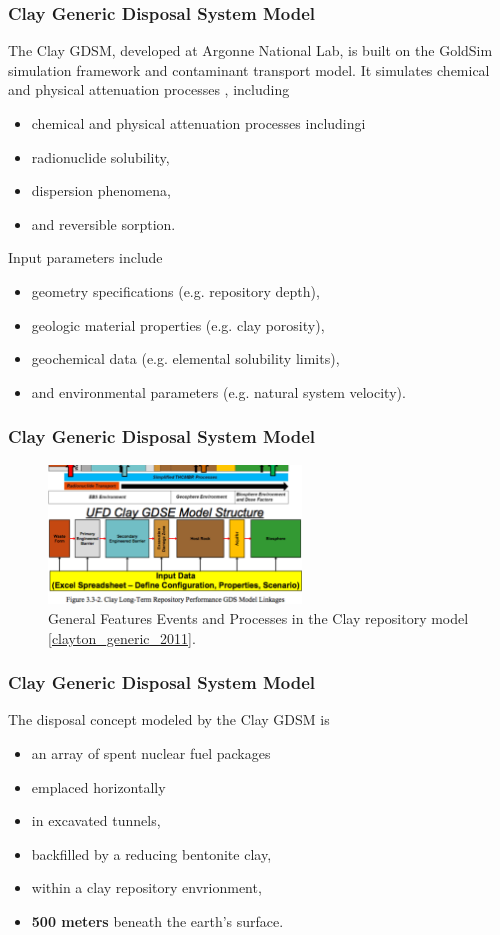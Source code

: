 \begin{frame}[c]
  \frametitle{Clay Generic Disposal System Model}
The Clay \gls{GDSM}, developed at Argonne National Lab, is built on the GoldSim 
simulation framework and contaminant transport model.  It simulates chemical and 
physical attenuation processes \cite{golder_goldsim_2010, 
golder_goldsim_ct_2010}, including 
\begin{itemize}
  \item  chemical and physical attenuation processes includingi
  \item radionuclide solubility,
  \item dispersion phenomena,
  \item and reversible sorption.
\end{itemize}

Input parameters include 
\begin{itemize}
  \item geometry specifications (e.g. repository depth),
  \item geologic material properties (e.g. clay porosity), 
  \item geochemical data (e.g. elemental solubility limits),
  \item and environmental parameters (e.g. natural system velocity). 
\end{itemize}
\end{frame}

\begin{frame}[c]
  \frametitle{Clay Generic Disposal System Model}
  \vspace{2cm}
\begin{figure}[h!]
\includegraphics[width=0.6\textwidth]{feps.eps}
\caption{General Features Events and Processes in the Clay repository model 
  \ref{clayton_generic_2011}.}
\end{figure}
\end{frame}

\begin{frame}[c]
  \frametitle{Clay Generic Disposal System Model}
The disposal concept modeled by the Clay \gls{GDSM} \cite{nutt_generic_2009} is
\begin{itemize}
  \item an array of spent nuclear fuel packages 
  \item emplaced horizontally
  \item in excavated tunnels, 
  \item backfilled by a reducing bentonite clay,
  \item within a clay repository envrionment, 
  \item \textbf{500 meters} beneath the earth's surface.
\end{itemize}
\end{frame}

